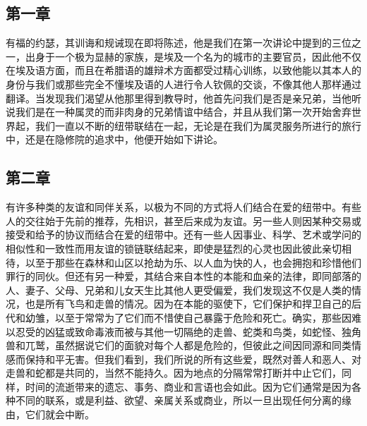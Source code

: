 \subsection{第一章}

\par

有福的约瑟，其训诲和规诫现在即将陈述，他是我们在第一次讲论中提到的三位之一，出身于一个极为显赫的家族，是埃及一个名为的城市的主要官员，因此他不仅在埃及语方面，而且在希腊语的雄辩术方面都受过精心训练，以致他能以其本人的身份与我们或那些完全不懂埃及语的人进行令人钦佩的交谈，不像其他人那样通过翻译。当发现我们渴望从他那里得到教导时，他首先问我们是否是亲兄弟，当他听说我们是在一种属灵的而非肉身的兄弟情谊中结合，并且从我们第一次开始舍弃世界起，我们一直以不断的纽带联结在一起，无论是在我们为属灵服务所进行的旅行中，还是在隐修院的追求中，他便开始如下讲论。\par


\subsection{第二章}

\par

有许多种类的友谊和同伴关系，以极为不同的方式将人们结合在爱的纽带中。有些人的交往始于先前的推荐，先相识，甚至后来成为友谊。另一些人则因某种交易或接受和给予的协议而结合在爱的纽带中。还有一些人因事业、科学、艺术或学问的相似性和一致性而用友谊的锁链联结起来，即使是猛烈的心灵也因此彼此亲切相待，以至于那些在森林和山区以抢劫为乐、以人血为快的人，也会拥抱和珍惜他们罪行的同伙。但还有另一种爱，其结合来自本性的本能和血亲的法律，即同部落的人、妻子、父母、兄弟和儿女天生比其他人更受偏爱，我们发现这不仅是人类的情况，也是所有飞鸟和走兽的情况。因为在本能的驱使下，它们保护和捍卫自己的后代和幼雏，以至于常常为了它们而不惜使自己暴露于危险和死亡。确实，那些因难以忍受的凶猛或致命毒液而被与其他一切隔绝的走兽、蛇类和鸟类，如蛇怪、独角兽和兀鹫，虽然据说它们的面貌对每个人都是危险的，但彼此之间因同源和同类情感而保持和平无害。但我们看到，我们所说的所有这些爱，既然对善人和恶人、对走兽和蛇都是共同的，当然不能持久。因为地点的分隔常常打断并中止它们，同样，时间的流逝带来的遗忘、事务、商业和言语也会如此。因为它们通常是因为各种不同的联系，或是利益、欲望、亲属关系或商业，所以一旦出现任何分离的缘由，它们就会中断。\par

